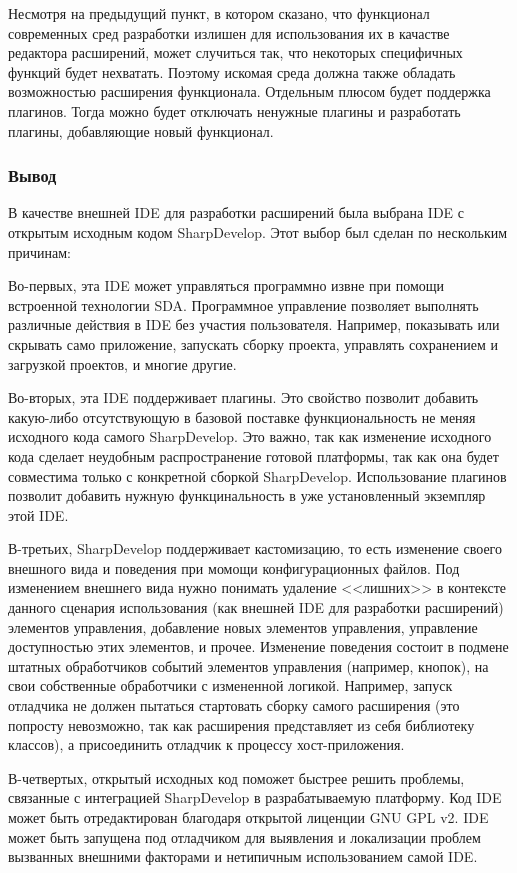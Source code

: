 Несмотря на предыдущий пункт, в котором сказано, что функционал современных сред разработки излишен для использования их в качастве редактора расширений, может случиться так, что некоторых специфичных функций будет нехватать. Поэтому искомая среда должна также обладать возможностью расширения функционала. Отдельным плюсом будет поддержка плагинов. Тогда можно будет отключать ненужные плагины и разработать плагины, добавляющие новый функционал.


\subsubsection{Вывод}

В качестве внешней IDE для разработки расширений была выбрана IDE с открытым исходным кодом SharpDevelop. Этот выбор был сделан по нескольким причинам:

Во-первых, эта IDE может управляться программно извне при помощи встроенной технологии SDA. Программное управление позволяет выполнять различные действия в IDE без участия пользователя. Например, показывать или скрывать само приложение, запускать сборку проекта, управлять сохранением и загрузкой проектов, и многие другие. 

Во-вторых, эта IDE поддерживает плагины. Это свойство позволит добавить какую-либо отсутствующую в базовой поставке функциональность не меняя исходного кода самого SharpDevelop. Это важно, так как изменение исходного кода сделает неудобным распространение готовой платформы, так как она будет совместима только с конкретной сборкой SharpDevelop. Использование плагинов позволит добавить нужную функцинальность в уже установленный экземпляр этой IDE.

В-третьих, SharpDevelop поддерживает кастомизацию, то есть изменение своего внешного вида и поведения при момощи конфигурационных файлов. Под изменением внешнего вида нужно понимать удаление <<лишних>> в контексте данного сценария использования (как внешней IDE для разработки расширений) элементов управления, добавление новых элементов управления, управление доступностью этих элементов, и прочее. Изменение поведения состоит в подмене штатных обработчиков событий элементов управления (например, кнопок), на свои собственные обработчики с измененной логикой. Например, запуск отладчика не должен пытаться стартовать сборку самого расширения (это попросту невозможно, так как расширения представляет из себя библиотеку классов), а присоединить отладчик к процессу хост-приложения.

В-четвертых, открытый исходных код поможет быстрее решить проблемы, связанные с интеграцией SharpDevelop в разрабатываемую платформу. Код IDE может быть отредактирован благодаря открытой лиценции GNU GPL v2. IDE может быть запущена под отладчиком для выявления и локализации проблем вызванных внешними факторами и нетипичным использованием самой IDE.

\pagebreak
